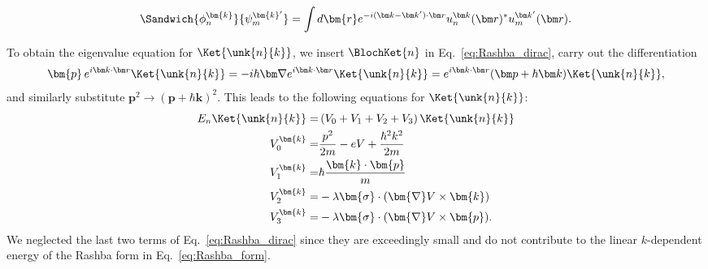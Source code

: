 \begin{equation}
	\Sandwich{\phi_n^{\bm{k}}}{\psi_m^{\bm{k}'}} = \int d\bm{r} e^{-i (\bm k - \bm k') \cdot \bm r} u_n^{\bm k }(\bm r)^* u_m^{\bm k'}(\bm r).
\end{equation}

To obtain the eigenvalue equation for $\Ket{\unk{n}{k}}$, we insert $\BlochKet{n}$ in Eq.~\eqref{eq:Rashba_dirac}, carry out the differentiation
\begin{equation}
	\label{eq:Rashba_momentum}
\bm{p} \, \Eikr\Ket{\unk{n}{k}} = -i \hbar \bm \nabla \Eikr\Ket{\unk{n}{k}} = \Eikr(\bm p + \hbar \bm k)\Ket{\unk{n}{k}},
\end{equation}
and similarly substitute $\bm{p}^2 \rightarrow (\bm{p}+\hbar \bm{k})^2$.
This leads to the following equations for $\Ket{\unk{n}{k}}$:
\begin{align}
	\label{eq:Rashba_unk_Vs}
	E_n \Ket{\unk{n}{k}} =& \left(V_0 + V_1  +  V_2 + V_3 \right) \Ket{\unk{n}{k}} \\
	V_0^{\bm{k}} =& \frac{p^2}{2m} - eV + \frac{\hbar^2 k^2}{2m} \\
	V_1^{\bm{k}} =& \hbar\frac{\bm{k}\cdot\bm{p}}{m} \\
	V_2^{\bm{k}} =& -\lambda \bm{\sigma} \cdot ( \bm{\nabla}V \times \bm{k}) \\
	V_3^{\bm{k}} =& -\lambda \bm{\sigma} \cdot ( \bm{\nabla}V \times \bm{p}).
\end{align}
We neglected the last two terms of Eq.~\eqref{eq:Rashba_dirac} since they are exceedingly small and do not contribute to the linear $k$-dependent energy of the Rashba form in Eq.~\eqref{eq:Rashba_form}.


